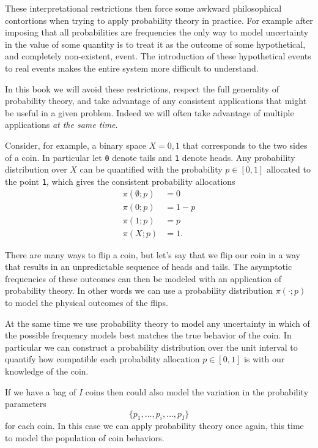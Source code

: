 \documentclass[
  letterpaper,
  DIV=11,
  numbers=noendperiod]{scrartcl}
\begin{document}
These interpretational restrictions then force some awkward
philosophical contortions when trying to apply probability theory in
practice. For example after imposing that all probabilities are
frequencies the only way to model uncertainty in the value of some
quantity is to treat it as the outcome of some hypothetical, and
completely non-existent, event. The introduction of these hypothetical
events to real events makes the entire system more difficult to
understand.

In this book we will avoid these restrictions, respect the full
generality of probability theory, and take advantage of any consistent
applications that might be useful in a given problem. Indeed we will
often take advantage of multiple applications \emph{at the same time}.

Consider, for example, a binary space \(X = {0, 1}\) that corresponds to
the two sides of a coin. In particular let \texttt{0} denote tails and
\texttt{1} denote heads. Any probability distribution over \(X\) can be
quantified with the probability \(p \in [0, 1]\) allocated to the point
\texttt{1}, which gives the consistent probability allocations
\begin{align*}
\pi( \emptyset; p ) &= 0
\\
\pi( {0}; p ) &= 1 - p
\\
\pi( {1}; p ) &= p
\\
\pi( X; p ) &= 1.
\end{align*}

There are many ways to flip a coin, but let's say that we flip our coin
in a way that results in an unpredictable sequence of heads and tails.
The asymptotic frequencies of these outcomes can then be modeled with an
application of probability theory. In other words we can use a
probability distribution \(\pi(\cdot; p)\) to model the physical
outcomes of the flips.

At the same time we use probability theory to model any uncertainty in
which of the possible frequency models best matches the true behavior of
the coin. In particular we can construct a probability distribution over
the unit interval to quantify how compatible each probability allocation
\(p \in [0, 1]\) is with our knowledge of the coin.

If we have a bag of \(I\) coins then could also model the variation in
the probability parameters \[
\{ p_{1}, \ldots, p_{i}, \ldots, p_{I} \}
\] for each coin. In this case we can apply probability theory once
again, this time to model the population of coin behaviors.
\end{document}

